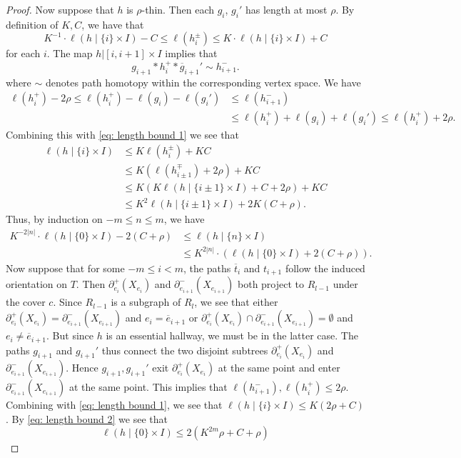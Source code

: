 \documentclass[11pt, a4paper]{amsart}
\theoremstyle{definition}
\DeclareMathOperator{\len}{\ell}
\begin{document}
\begin{proof}
Now suppose that $h$ is $\rho$-thin. Then each $g_{i}$, $g_{i}'$ has length at most $\rho$. By definition of $K, C$, we have that 
\begin{equation}
\label{eq: length bound 1}
K^{-1}\cdot \len(h\mid\{i\}\times I)  - C\leqslant \len(h_i^{\pm})\leqslant K\cdot \len(h\mid\{i\}\times I) + C
\end{equation}
for each $i$. The map $h|[i, i+1]\times I$ implies that 
\begin{equation}
\label{eq: path_homotopy}
g_{i+1}*h_i^+*\overline{g}_{i+1}'\sim h_{i+1}^-.
\end{equation}
where $\sim$ denotes path homotopy within the corresponding vertex space. We have
\begin{align*}
\len(h_i^+) - 2\rho \leqslant \len(h_i^+) - \len(g_i) - \len(g_i') &\leqslant \len(h_{i+1}^-)\\
						&\leqslant \len(h_i^+) + \len(g_i) + \len(g_i') \leqslant \len(h_i^+) + 2\rho. 
\end{align*}
Combining this with \eqref{eq: length bound 1} we see that
\begin{align*}
\len(h\mid\{i\}\times I)&\leqslant K\len(h^{\pm}_i) + KC\\
					&\leqslant K(\len(h^{\mp}_{i\pm1}) + 2\rho) + KC\\
					&\leqslant K(K\len(h\mid\{i\pm1\}\times I) + C + 2\rho) + KC\\
					&\leqslant K^2\len(h\mid\{i\pm1\}\times I) + 2K(C + \rho).
\end{align*}
Thus, by induction on $-m\leqslant n\leqslant m$, we have
\begin{align}
\label{eq: length bound 2}
K^{-2|n|}\cdot \len(h\mid\{0\}\times I) - 2(C+\rho)&\leqslant \len(h\mid\{n\}\times I)\\
\label{eq: length bound 3}				&\leqslant K^{2|n|}\cdot(\len(h\mid\{0\}\times I) + 2(C+\rho)).
\end{align}
Now suppose that for some $-m\leqslant i< m$, the paths $\overline{t}_i$ and $t_{i+1}$ follow the induced orientation on $T$. Then $\partial_{e_i}^+(X_{e_i})$ and $\partial_{e_{i+1}}^-(X_{e_{i+1}})$ both project to $R_{l-1}$ under the cover $c$. Since $R_{l-1}$ is a subgraph of $R_{l}$, we see that either $\partial_{e_i}^+(X_{e_i}) = \partial_{e_{i+1}}^-(X_{e_{i+1}})$ and $e_i = \overline{e}_{i+1}$ or $\partial_{e_i}^+(X_{e_i})\cap\partial_{e_{i+1}}^-(X_{e_{i+1}}) = \emptyset$ and $e_i\neq \overline{e}_{i+1}$. But since $h$ is an essential hallway, we must be in the latter case. The paths $g_{i+1}$ and $g_{i+1}'$ thus connect the two disjoint subtrees $\partial_{e_i}^+(X_{e_i})$ and $\partial_{e_{i+1}}^-(X_{e_{i+1}})$. Hence $g_{i+1}, g_{i+1}'$ exit $\partial_{e_i}^+(X_{e_i})$ at the same point and enter $\partial_{e_{i+1}}^-(X_{e_{i+1}})$ at the same point. This implies that $\len(h_{i+1}^-), \len(h_i^+)\leqslant 2\rho$. Combining with \eqref{eq: length bound 1}, we see that $\len(h\mid \{i\}\times I)\leqslant K(2\rho +C)$. By \eqref{eq: length bound 2} we see that
\[
\len(h\mid \{0\}\times I)\leqslant 2(K^{2m}\rho + C + \rho)
\]


\end{proof}
\end{document}
